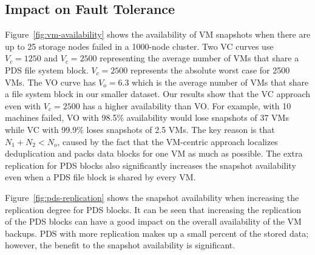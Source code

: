 \subsection{Impact on Fault Tolerance}
Figure~\ref{fig:vm-availability} shows the availability of VM snapshots when 
there are up to 25 storage nodes failed in a 1000-node cluster. 
Two VC curves use $V_c=1250$ and $V_c=2500$ representing the average number of VMs that share a PDS file system block. 
$V_c=2500$ represents  the absolute worst case for 2500 VMs. 
The VO curve has  $V_o=6.3$ which is  the average number of VMs that share a file system block in our smaller dataset. 
Our results show that the VC approach even with $V_c=2500$ has a higher availability than VO.
For example, with 10 machines failed, VO with 98.5\% availability would lose snapshots of 37 VMs 
while VC with 99.9\% loses snapshots of 2.5 VMs.
The key reason is that  $N_1 +N_2 < N_o$, caused by the fact that the VM-centric approach localizes deduplication
and packs  data blocks for one VM as much as possible.  The extra replication
for PDS blocks also significantly increases the snapshot availability even when
a PDS file block is shared by every VM.

Figure~\ref{fig:pds-replication}
shows the snapshot availability when increasing the replication degree for PDS blocks. 
It can be seen that increasing the replication of 
the PDS blocks can have a good impact on the overall availability of the VM backups. 
PDS with more replication  makes up a small percent of the
stored data; however, the benefit to the snapshot availability is significant. 

